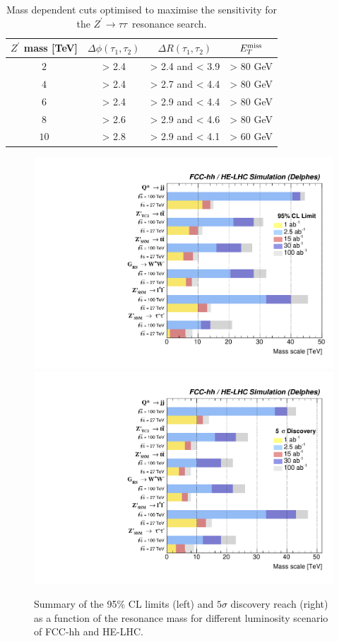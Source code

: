\documentclass[a4paper,11pt]{article}
\newcommand{\Zp}{\ensuremath{Z^{\prime}}}
\newcommand*{\Zptata}{\ensuremath{Z^{\prime}\rightarrow \tau\tau}}
\newcommand*{\met}{\ensuremath{E_{T}^{\rm{miss}}}}
\begin{document}
\begin{table}[!htb]
   \centering
\begin{tabular}{c|c|c|c}
   $\Zp$ mass [TeV] &  $\Delta \phi(\tau_1, \tau_2)$&  $\Delta R(\tau_1, \tau_2)$ & $\met$\\
  \hline
  \hline
   $2$ & > 2.4 & > 2.4 and < 3.9 & > 80 GeV\\
   $4$ & > 2.4 & > 2.7 and < 4.4 & > 80 GeV\\
   $6$ & > 2.4 & > 2.9 and < 4.4 & > 80 GeV\\
   $8$ & > 2.6 & > 2.9 and < 4.6 & > 80 GeV\\
  $10$ & > 2.8 & > 2.9 and < 4.1 & > 60 GeV\\
  \end{tabular}
  \caption{Mass dependent cuts optimised to maximise the sensitivity for the \Zptata\ resonance search.}
  \label{tab:leptonicresonances:tautau27}
\end{table}




\begin{figure}[!htb]
  \centering
  \includegraphics[width=0.49\columnwidth]{Fig/summaryLimit.pdf}
  \includegraphics[width=0.49\columnwidth]{Fig/summaryDisco.pdf}
  \caption{Summary of the 95\% CL limits (left) and $5\sigma$ discovery reach (right) as a function of the resonance mass for different luminosity scenario of FCC-hh and HE-LHC.}
  \label{figure:resonances:summary}
\end{figure}
\end{document}

